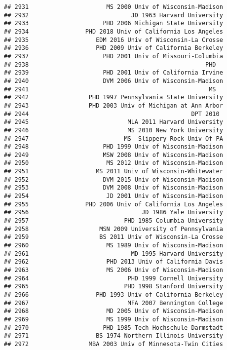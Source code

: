 \documentclass[
]{article}
\begin{document}
\begin{verbatim}
## 2931                      MS 2000 Univ of Wisconsin-Madison
## 2932                             JD 1963 Harvard University
## 2933                     PHD 2006 Michigan State University
## 2934                PHD 2018 Univ of California Los Angeles
## 2935                   EDM 2016 Univ of Wisconsin-La Crosse
## 2936                   PHD 2009 Univ of California Berkeley
## 2937                     PHD 2001 Univ of Missouri-Columbia
## 2938                                                  PHD  
## 2939                     PHD 2001 Univ of California Irvine
## 2940                     DVM 2006 Univ of Wisconsin-Madison
## 2941                                                   MS  
## 2942                 PHD 1997 Pennsylvania State University
## 2943                 PHD 2003 Univ of Michigan at Ann Arbor
## 2944                                              DPT 2010 
## 2945                            MLA 2011 Harvard University
## 2946                            MS 2010 New York University
## 2947                           MS  Slippery Rock Univ Of PA
## 2948                     PHD 1999 Univ of Wisconsin-Madison
## 2949                     MSW 2008 Univ of Wisconsin-Madison
## 2950                      MS 2012 Univ of Wisconsin-Madison
## 2951                   MS 2011 Univ of Wisconsin-Whitewater
## 2952                     DVM 2015 Univ of Wisconsin-Madison
## 2953                     DVM 2008 Univ of Wisconsin-Madison
## 2954                      JD 2001 Univ of Wisconsin-Madison
## 2955                PHD 2006 Univ of California Los Angeles
## 2956                                JD 1986 Yale University
## 2957                           PHD 1985 Columbia University
## 2958                    MSN 2009 University of Pennsylvania
## 2959                    BS 2011 Univ of Wisconsin-La Crosse
## 2960                      MS 1989 Univ of Wisconsin-Madison
## 2961                             MD 1995 Harvard University
## 2962                      PHD 2013 Univ of California Davis
## 2963                      MS 2006 Univ of Wisconsin-Madison
## 2964                            PHD 1999 Cornell University
## 2965                           PHD 1998 Stanford University
## 2966                   PHD 1993 Univ of California Berkeley
## 2967                            MFA 2007 Bennington College
## 2968                      MD 2005 Univ of Wisconsin-Madison
## 2969                      MS 1999 Univ of Wisconsin-Madison
## 2970                     PHD 1985 Tech Hochschule Darmstadt
## 2971                   BS 1974 Northern Illinois University
## 2972                 MBA 2003 Univ of Minnesota-Twin Cities

\end{verbatim}
\end{document}
